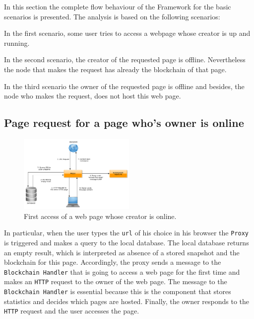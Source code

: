 
In this section the complete flow behaviour of the Framework for the basic scenarios 
is presented. The analysis is based on the following scenarios:

\begin{description}
\item In the first scenario, some user tries to access a webpage whose creator is up and running. 
\item In the second scenario, the creator of the requested page is offline. 
Nevertheless the node that makes the request has already the blockchain of that page.
\item In the third scenario the owner of the requested page is offline and besides, the node who 
makes the request, does not host this web page.
\end{description}

\subsection{Page request for a page who's owner is online}

\begin{figure}[htp]
\center
\includegraphics[width=0.5\textwidth]{pictures/fetch_page_online_creator.pdf}
\caption{First access of a web page whose creator is online.}
\label{fig:online_creator}
\end{figure}

In particular, when the user types the \texttt{url} of his choice in his browser the \texttt{Proxy} is
triggered and makes a query to the local database. The local database returns an empty result,
which is interpreted as absence of a stored snapshot and the blockchain for this page.
Accordingly, the proxy sends a message to the \texttt{Blockchain Handler} that is going to access 
a web page for the first time and makes an \texttt{HTTP} request to the owner of the web page. 
The message to the \texttt{Blockchain Handler} is essential because this is the component that stores 
statistics and decides which pages are hosted. Finally, the owner responds to the \texttt{HTTP} request
and the user accesses the page.

